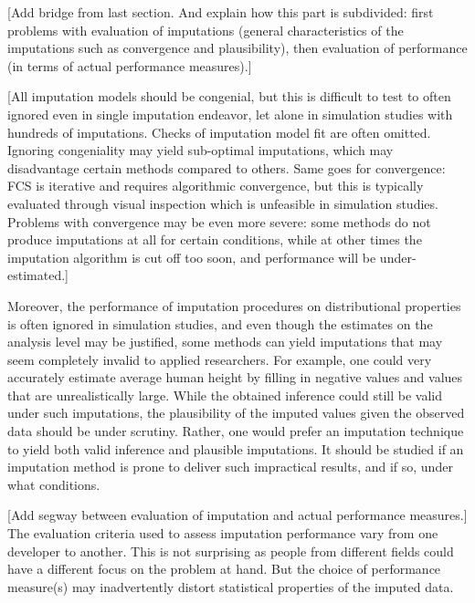 \documentclass[bimj,fleqn]{w-art}
\theoremstyle{plain}
\theoremstyle{definition}
\begin{document}

[Add bridge from last section. And explain how this part is subdivided: first problems with evaluation of imputations (general characteristics of the imputations such as convergence and plausibility), then evaluation of performance (in terms of actual performance measures).]

[All imputation models should be congenial, but this is difficult to test to often ignored even in single imputation endeavor, let alone in simulation studies with hundreds of imputations. Checks of imputation model fit are often omitted. Ignoring congeniality may yield sub-optimal imputations, which may disadvantage certain methods compared to others. Same goes for convergence: FCS is iterative and requires algorithmic convergence, but this is typically evaluated through visual inspection which is unfeasible in simulation studies. Problems with convergence may be even more severe: some methods do not produce imputations at all for certain conditions, while at other times the imputation algorithm is cut off too soon, and performance will be under-estimated.]

Moreover, the performance of imputation procedures on distributional properties is often ignored in simulation studies, and even though the estimates on the analysis level may be justified, some methods can yield imputations that may seem completely invalid to applied researchers. For example, one could very accurately estimate average human height by filling in negative values and values that are unrealistically large. While the obtained inference could still be valid under such imputations, the plausibility of the imputed values given the observed data should be under scrutiny. Rather, one would prefer an imputation technique to yield both valid inference and plausible imputations. It should be studied if an imputation method is prone to deliver such impractical results, and if so, under what conditions.

[Add segway between evaluation of imputation and actual performance measures.]
The evaluation criteria used to assess imputation performance vary from one developer to another. This is not surprising as people from different fields could have a different focus on the problem at hand. But the choice of performance measure(s) may inadvertently distort statistical properties of the imputed data.
\end{document}
